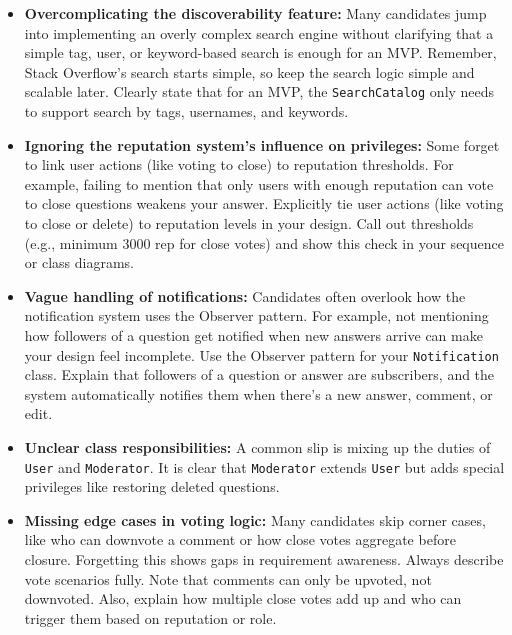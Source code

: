 \begin{itemize}
\item
\protect{}\label{iqbsl6X9Amy4EtYYfrcjv}
\textbf{Overcomplicating the discoverability feature:} Many candidates jump into implementing an overly complex search engine without clarifying that a simple tag, user, or keyword-based search is enough for an MVP. Remember, Stack Overflow's search starts simple, so keep the search logic simple and scalable later. Clearly state that for an MVP, the \texttt{SearchCatalog} only needs to support search by tags, usernames, and keywords.
\item
\protect{}\label{RCjfbIAQZDTlFRWA6948r}
\textbf{Ignoring the reputation system's influence on privileges:} Some forget to link user actions (like voting to close) to reputation thresholds. For example, failing to mention that only users with enough reputation can vote to close questions weakens your answer. Explicitly tie user actions (like voting to close or delete) to reputation levels in your design. Call out thresholds (e.g., minimum 3000 rep for close votes) and show this check in your sequence or class diagrams.
\item
\protect{}\label{hPqobGt6jMmKH5iD1NvUO}
\textbf{Vague handling of notifications:} Candidates often overlook how the notification system uses the Observer pattern. For example, not mentioning how followers of a question get notified when new answers arrive can make your design feel incomplete. Use the Observer pattern for your \texttt{Notification} class. Explain that followers of a question or answer are subscribers, and the system automatically notifies them when there's a new answer, comment, or edit.
\item
\protect{}\label{TMMyKkBHxTcZBOki132KH}
\textbf{Unclear class responsibilities:} A common slip is mixing up the duties of \texttt{User} and \texttt{Moderator}. It is clear that \texttt{Moderator} extends \texttt{User} but adds special privileges like restoring deleted questions.
\item
\protect{}\label{vby1q-3378AVbRZQlzXms}
\textbf{Missing edge cases in voting logic:} Many candidates skip corner cases, like who can downvote a comment or how close votes aggregate before closure. Forgetting this shows gaps in requirement awareness. Always describe vote scenarios fully. Note that comments can only be upvoted, not downvoted. Also, explain how multiple close votes add up and who can trigger them based on reputation or role.
\end{itemize}

